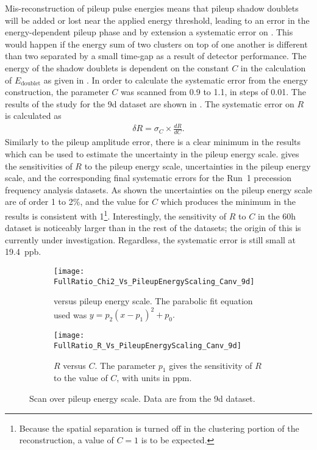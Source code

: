 Mis-reconstruction of pileup pulse energies means that pileup shadow doublets will be added or lost near the applied energy threshold, leading to an error in the energy-dependent pileup phase and by extension a systematic error on \R. This would happen if the energy sum of two clusters on top of one another is different than two separated by a small time-gap as a result of detector performance. The energy of the shadow doublets is dependent on the constant $C$ in the calculation of $E_{\text{doublet}}$ as given in . In order to calculate the systematic error from the energy construction, the parameter $C$ was scanned from 0.9 to 1.1, in steps of 0.01. The results of the study for the 9d dataset are shown in . The systematic error on $R$ is calculated as 
    \begin{align}
        \delta R = \sigma_{C} \times \frac{dR}{dC}.
    \end{align}
Similarly to the pileup amplitude error, there is a clear minimum in the \chisq results which can be used to estimate the uncertainty in the pileup energy scale.  gives the sensitivities of $R$ to the pileup energy scale, uncertainties in the pileup energy scale, and the corresponding final systematic errors for the Run~1 precession frequency analysis datasets. As shown the uncertainties on the pileup energy scale are of order 1 to 2\%, and the value for $C$ which produces the minimum in the \chisq results is consistent with 1\footnote{Because the spatial separation is turned off in the clustering portion of the reconstruction, a value of $C = 1$ is to be expected.}. Interestingly, the sensitivity of $R$ to $C$ in the 60h dataset is noticeably larger than in the rest of the datasets; the origin of this is currently under investigation. Regardless, the systematic error is still small at \SI{19.4}{ppb}.


\begin{figure}
\centering
    \begin{subfigure}[t]{0.45\textwidth}
        \centering
        \texttt{[image: FullRatio\_Chi2\_Vs\_PileupEnergyScaling\_Canv\_9d]}
        \caption{\chisq versus pileup energy scale. The parabolic fit equation used was $y = p_{2}(x - p_{1})^{2} + p_{0}.$}
    \end{subfigure}%
    \hspace{1cm}
    \begin{subfigure}[t]{0.45\textwidth}
        \centering
        \texttt{[image: FullRatio\_R\_Vs\_PileupEnergyScaling\_Canv\_9d]}
        \caption{$R$ versus $C$. The parameter $p_{1}$ gives the sensitivity of $R$ to the value of $C$, with units in ppm.}
    \end{subfigure}
\caption[Pileup energy scale scan]{Scan over pileup energy scale. Data are from the 9d dataset.}
\label{fig:PEscan}
\end{figure}


